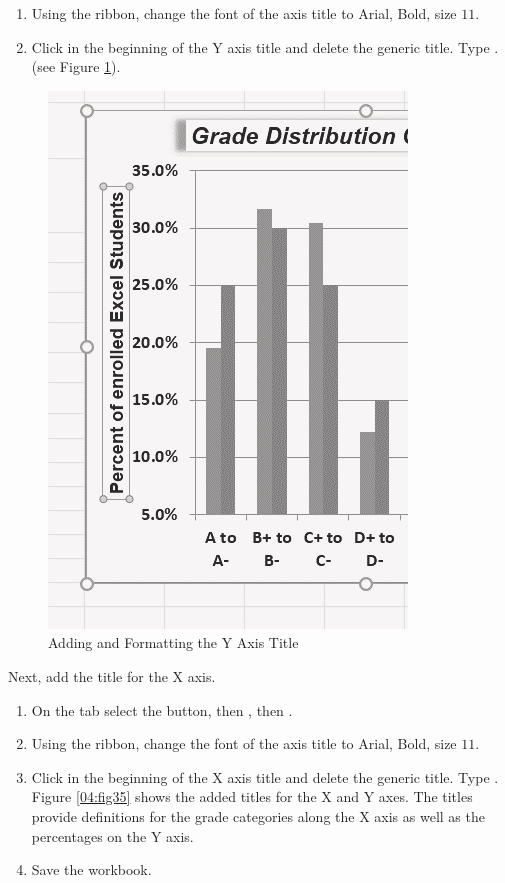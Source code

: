 \begin{enumerate}
	\item Using the  ribbon, change the font of the axis title to Arial, Bold, size $ 11 $.
	\item Click in the beginning of the Y axis title and delete the generic title. Type .(see Figure \ref{04:fig34}).
\end{enumerate}

\begin{figure}[H]
	\centering
	\includegraphics[width=\maxwidth{.95\linewidth}]{gfx/ch04_fig34}
	\caption{Adding and Formatting the Y Axis Title}
	\label{04:fig34}
\end{figure}

Next, add the title for the X axis.

\begin{enumerate}
	\item On the  tab select the  button, then , then .
	\item Using the  ribbon, change the font of the axis title to Arial, Bold, size $ 11 $. 
	\item Click in the beginning of the X axis title and delete the generic title. Type . Figure \ref{04:fig35} shows the added titles for the X and Y axes. The titles provide definitions for the grade categories along the X axis as well as the percentages on the Y axis.
	\item Save the workbook.
\end{enumerate}

